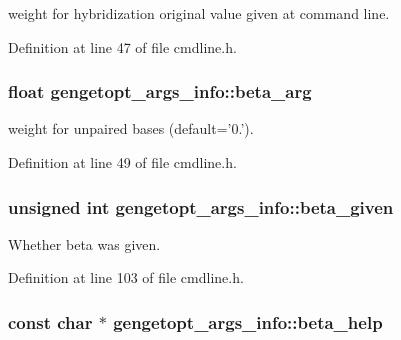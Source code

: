 weight for hybridization original value given at command line. 



Definition at line 47 of file cmdline.\+h.

\hypertarget{structgengetopt__args__info_af10d11b97a09ce5f90816f475f099383}{
\subsubsection[{beta\+\_\+arg}]{\setlength{\rightskip}{0pt plus 5cm}float gengetopt\+\_\+args\+\_\+info\+::beta\+\_\+arg}}\label{structgengetopt__args__info_af10d11b97a09ce5f90816f475f099383}


weight for unpaired bases (default='0.'). 



Definition at line 49 of file cmdline.\+h.

\hypertarget{structgengetopt__args__info_a78fbc9190ccaddb0718c66b5ea3f16d1}{
\subsubsection[{beta\+\_\+given}]{\setlength{\rightskip}{0pt plus 5cm}unsigned int gengetopt\+\_\+args\+\_\+info\+::beta\+\_\+given}}\label{structgengetopt__args__info_a78fbc9190ccaddb0718c66b5ea3f16d1}


Whether beta was given. 



Definition at line 103 of file cmdline.\+h.

\hypertarget{structgengetopt__args__info_a4a10c9f1eac9e95ee84071c2c42924ac}{
\subsubsection[{beta\+\_\+help}]{\setlength{\rightskip}{0pt plus 5cm}const char $\ast$ gengetopt\+\_\+args\+\_\+info\+::beta\+\_\+help}}\label{structgengetopt__args__info_a4a10c9f1eac9e95ee84071c2c42924ac}


